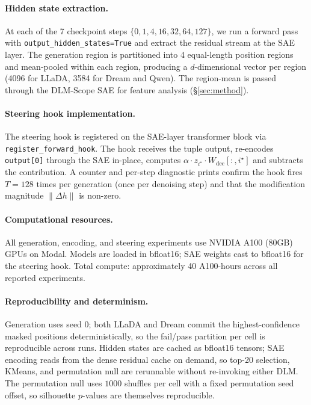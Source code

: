 \documentclass[11pt]{article}
\begin{document}
\paragraph{Hidden state extraction.}
At each of the 7 checkpoint steps $\{0, 1, 4, 16, 32, 64, 127\}$, we run a forward pass with \mbox{\texttt{output\_hidden\_states=True}} and extract the residual stream at the SAE layer.
The generation region is partitioned into 4 equal-length position regions and mean-pooled within each region, producing a $d$-dimensional vector per region (4096 for LLaDA, 3584 for Dream and Qwen).
The region-mean is passed through the DLM-Scope SAE for feature analysis (\S\ref{sec:method}).

\paragraph{Steering hook implementation.}
The steering hook is registered on the SAE-layer transformer block via \texttt{register\_forward\_hook}.
The hook receives the tuple output, re-encodes \texttt{output[0]} through the SAE in-place, computes $\alpha \cdot z_{i^\star} \cdot W_{\mathrm{dec}}[:, i^\star]$ and subtracts the contribution.
A counter and per-step diagnostic prints confirm the hook fires $T{=}128$ times per generation (once per denoising step) and that the modification magnitude $\|\Delta h\|$ is non-zero.

\paragraph{Computational resources.}
All generation, encoding, and steering experiments use NVIDIA A100 (80GB) GPUs on Modal.
Models are loaded in bfloat16; SAE weights cast to bfloat16 for the steering hook.
Total compute: approximately 40 A100-hours across all reported experiments.

\paragraph{Reproducibility and determinism.}
Generation uses seed $0$; both LLaDA and Dream commit the highest-confidence masked positions deterministically, so the fail/pass partition per cell is reproducible across runs.
Hidden states are cached as bfloat16 tensors; SAE encoding reads from the dense residual cache on demand, so top-20 selection, KMeans, and permutation null are rerunnable without re-invoking either DLM.
The permutation null uses $1000$ shuffles per cell with a fixed permutation seed offset, so silhouette $p$-values are themselves reproducible.
\end{document}
